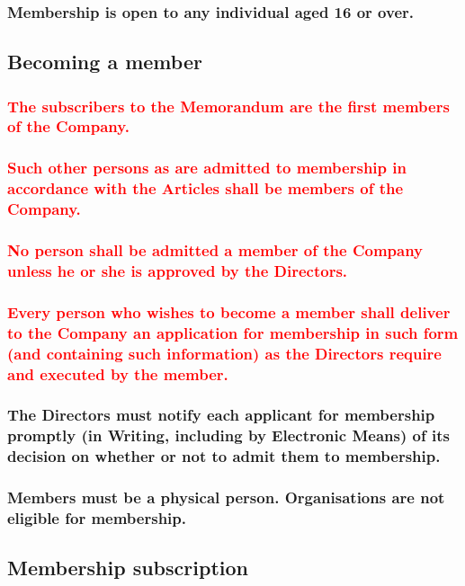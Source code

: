 \documentclass[12pt]{article}
\begin{document}
\subsubsection{Membership is open to any individual aged 16 or over.}

\subsection{Becoming a member}
\subsubsection{\textcolor{red}{The subscribers to the Memorandum are the first members of the Company.}}
\subsubsection{\textcolor{red}{Such other persons as are admitted to membership in accordance with the Articles shall be members of the Company.}}
\subsubsection{\textcolor{red}{No person shall be admitted a member of the Company unless he or she is approved by the Directors.}}
\subsubsection{\textcolor{red}{Every person who wishes to become a member shall deliver to the Company an application for membership in such form (and containing such information) as the Directors require and executed by the member.}} %
\subsubsection{The Directors must notify each applicant for membership promptly (in Writing, including by Electronic Means) of its decision on whether or not to admit them to membership.} %
\subsubsection{Members must be a physical person. Organisations are not eligible for membership.} %

\subsection{Membership subscription}
\end{document}
